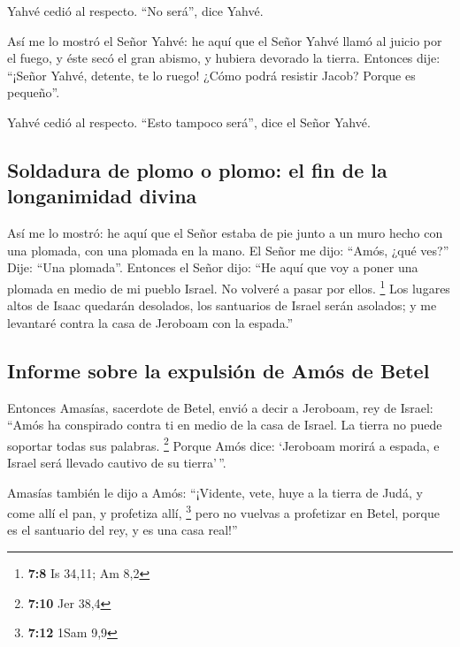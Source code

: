 \begin{paracol}{2}
 Yahvé cedió al respecto. ``No será'', dice Yahvé.

 Así me lo mostró el Señor Yahvé: he aquí que el Señor
Yahvé llamó al juicio por el fuego, y éste secó el gran abismo, y
hubiera devorado la tierra.  Entonces dije: ``¡Señor
Yahvé, detente, te lo ruego! ¿Cómo podrá resistir Jacob? Porque es
pequeño''.

 Yahvé cedió al respecto. ``Esto tampoco será'', dice el
Señor Yahvé.

\hypertarget{soldadura-de-plomo-o-plomo-el-fin-de-la-longanimidad-divina}{%
\subsection{Soldadura de plomo o plomo: el fin de la longanimidad
divina}\label{soldadura-de-plomo-o-plomo-el-fin-de-la-longanimidad-divina}}

 Así me lo mostró: he aquí que el Señor estaba de pie
junto a un muro hecho con una plomada, con una plomada en la mano.
 El Señor me dijo: ``Amós, ¿qué ves?'' Dije: ``Una
plomada''. Entonces el Señor dijo: ``He aquí que voy a poner una plomada
en medio de mi pueblo Israel. No volveré a pasar por ellos. \footnote{\textbf{7:8}
  Is 34,11; Am 8,2}  Los lugares altos de Isaac quedarán
desolados, los santuarios de Israel serán asolados; y me levantaré
contra la casa de Jeroboam con la espada.''

\hypertarget{informe-sobre-la-expulsiuxf3n-de-amuxf3s-de-betel}{%
\subsection{Informe sobre la expulsión de Amós de
Betel}\label{informe-sobre-la-expulsiuxf3n-de-amuxf3s-de-betel}}

 Entonces Amasías, sacerdote de Betel, envió a decir a
Jeroboam, rey de Israel: ``Amós ha conspirado contra ti en medio de la
casa de Israel. La tierra no puede soportar todas sus palabras.
\footnote{\textbf{7:10} Jer 38,4}  Porque Amós dice:
`Jeroboam morirá a espada, e Israel será llevado cautivo de su
tierra'\,''.

 Amasías también le dijo a Amós: ``¡Vidente, vete, huye a
la tierra de Judá, y come allí el pan, y profetiza allí, \footnote{\textbf{7:12}
  1Sam 9,9}  pero no vuelvas a profetizar en Betel,
porque es el santuario del rey, y es una casa real!''


\end{paracol}
